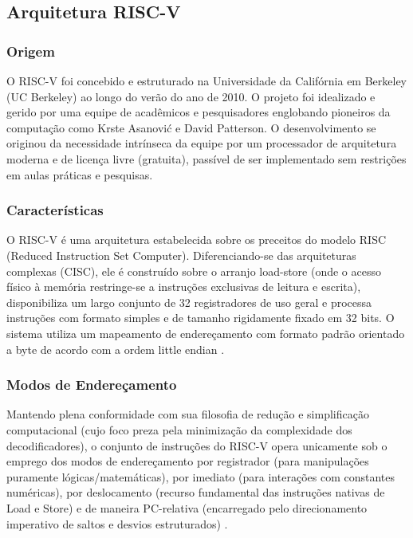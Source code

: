 \documentclass[
	12pt,				%
	oneside,
	a4paper,			%
	english,			%
	french,				%
	spanish,			%
	brazil,				%
	]{abntex2}
\begin{document}
\subsection{Arquitetura RISC-V}
\subsubsection{Origem}
O RISC-V foi concebido e estruturado na Universidade da Califórnia em Berkeley (UC Berkeley) ao longo do verão do ano de 2010. O projeto foi idealizado e gerido por uma equipe de acadêmicos e pesquisadores englobando pioneiros da computação como Krste Asanović e David Patterson. O desenvolvimento se originou da necessidade intrínseca da equipe por um processador de arquitetura moderna e de licença livre (gratuita), passível de ser implementado sem restrições em aulas práticas e pesquisas.

\subsubsection{Características}
O RISC-V é uma arquitetura estabelecida sobre os preceitos do modelo RISC (Reduced Instruction Set Computer). Diferenciando-se das arquiteturas complexas (CISC), ele é construído sobre o arranjo load-store (onde o acesso físico à memória restringe-se a instruções exclusivas de leitura e escrita), disponibiliza um largo conjunto de 32 registradores de uso geral e processa instruções com formato simples e de tamanho rigidamente fixado em 32 bits. O sistema utiliza um mapeamento de endereçamento com formato padrão orientado a byte de acordo com a ordem little endian \cite{RISCVINTERNATIONAL}.

\subsubsection{Modos de Endereçamento}
Mantendo plena conformidade com sua filosofia de redução e simplificação computacional (cujo foco preza pela minimização da complexidade dos decodificadores), o conjunto de instruções do RISC-V opera unicamente sob o emprego dos modos de endereçamento por registrador (para manipulações puramente lógicas/matemáticas), por imediato (para interações com constantes numéricas), por deslocamento (recurso fundamental das instruções nativas de Load e Store) e de maneira PC-relativa (encarregado pelo direcionamento imperativo de saltos e desvios estruturados) \cite{RISCVINTERNATIONAL}.
\end{document}
